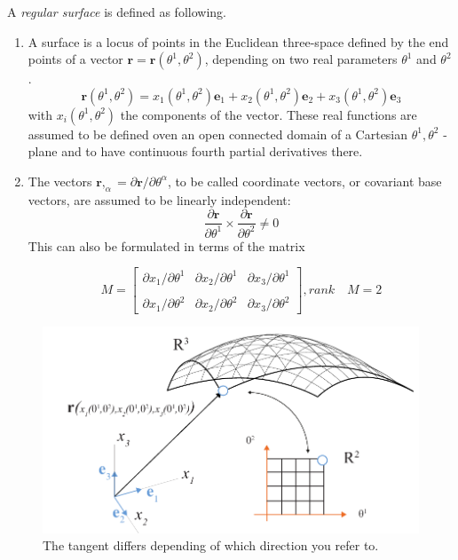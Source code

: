 A \textit{regular surface} is defined as following.

 \renewcommand{\labelenumii}{\Roman{enumii}}
 \begin{enumerate}
 \item A surface is a locus of points in the Euclidean three-space defined by the end points of a vector $\textbf{r} = \textbf{r}(\theta^1 ,\theta^2)$, depending on two real parameters $\theta^1$ and $\theta^2$.
 \begin{equation}
 \textbf{r}(\theta^1,\theta^2) = x_1(\theta^1,\theta^2)\textbf{e}_1 +  x_2(\theta^1,\theta^2)\textbf{e}_2+  x_3(\theta^1,\theta^2)\textbf{e}_3
 \end{equation}
 with $x_i(\theta^1,\theta^2)$ the components of the vector. These real functions are assumed to be defined oven an open connected domain of a Cartesian $\theta^1, \theta^2$ - plane and to have continuous fourth partial derivatives there.
 \item The vectors $\textbf{r},_\alpha = \partial\textbf{r}/\partial \theta^\alpha $, to be called coordinate vectors, or covariant base vectors, are assumed to be linearly independent:
 \begin{equation}
 \frac{\partial\textbf{r}}{\partial \theta^1} \times  \frac{\partial\textbf{r}}{\partial \theta^2} \neq 0
 \end{equation}
 This can also be formulated in terms of the matrix
 

\[M =
\begin{bmatrix}
    \partial x_1/ \partial\theta^1 & \partial x_2/ \partial\theta^1 & \partial x_3/ \partial\theta^1\\
    \\
    \partial x_1/ \partial\theta^2 & \partial x_2/ \partial\theta^2 & \partial x_3/ \partial\theta^2
\end{bmatrix} , rank \quad M = 2
\]
 
 \end{enumerate}




\begin{figure}[H]
\centering
\includegraphics[width=1.0\linewidth]{figure/Theory/SurfDefinition.pdf}
 
\caption{The tangent differs depending of which direction you refer to. }
\end{figure}







